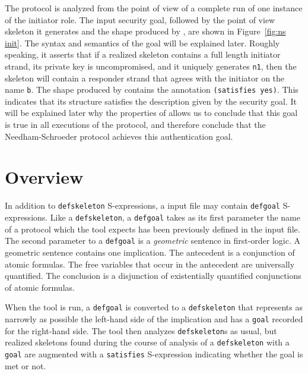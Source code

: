 The protocol is analyzed from the point of view of a complete run of
one instance of the initiator role.  The input security goal, followed
by the point of view skeleton it generates and the shape produced by
{\cpsa}, are shown in Figure~\ref{fig:ns init}.  The syntax and
semantics of the goal will be explained later.  Roughly speaking, it
asserts that if a realized skeleton contains a full length initiator
strand, its private key is uncompromised, and it uniquely generates
\texttt{n1}, then the skeleton will contain a responder strand that
agrees with the initiator on the name \texttt{b}.  The shape produced
by {\cpsa} contains the annotation \texttt{(satisfies yes)}.  This
indicates that its structure satisfies the description given by the
security goal.  It will be explained later why the properties of
{\cpsa} allows us to conclude that this goal is true in all executions
of the protocol, and therefore conclude that the Needham-Schroeder
protocol achieves this authentication goal.

\section{Overview}\label{sec:goalsoverview}

In addition to \texttt{defskeleton} S-expressions, a {\cpsa} input
file may contain \texttt{defgoal} S-expressions.  Like a
\texttt{defskeleton}, a \texttt{defgoal} takes as its first parameter
the name of a protocol which the tool expects has been previously
defined in the input file.  The second parameter to a \texttt{defgoal}
is a \emph{geometric} sentence in first-order logic.  A geometric
sentence contains one implication.  The antecedent is a conjunction
of atomic formulas.  The free variables that occur in the antecedent
are universally quantified.  The conclusion is a disjunction of
existentially quantified conjunctions of atomic formulas.


When the tool is run, a \texttt{defgoal} is converted to a
\texttt{defskeleton} that represents as narrowly as possible the
left-hand side of the implication and has a \texttt{goal} recorded for
the right-hand side.  The tool then analyzes \texttt{defskeleton}s as
usual, but realized skeletons found during the course of analysis of a
\texttt{defskeleton} with a \texttt{goal} are augmented with
a \texttt{satisfies} S-expression indicating whether the goal is met or
not.

